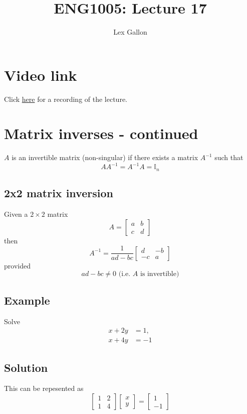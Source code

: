 \documentclass[11pt]{article}
\begin{document}
\title{ENG1005: Lecture 17}
\author{Lex Gallon}
\maketitle

\tableofcontents

\section*{Video link}
Click \href{https://echo360.org.au/lesson/G_32340f5d-ff38-43d2-be9d-d88ddb1b3611_b944cecf-8ba5-40d3-a870-0243a0a9e78c_2020-04-29T14:58:00.000_2020-04-29T15:53:00.000/classroom}{here} for a recording of the lecture.

\section{Matrix inverses - continued}
$A$ is an invertible matrix (non-singular) if there exists a matrix $A^{-1}$ such that
\[ AA^{-1} = A^{-1}A = \mathbb{I}_n \]

\subsection{2x2 matrix inversion}
Given a $2 \times 2$ matrix
\[ A = \begin{bmatrix}
a & b \\
c & d
\end{bmatrix} \]
then
\[ A^{-1} = \frac{1}{ad -bc} \begin{bmatrix}
d & -b\\
-c & a
\end{bmatrix} \]
provided
\[ ad - bc \not = 0 \text{ (i.e. } A \text{ is invertible)} \]

\subsection{Example}
Solve
\begin{align*}
x+ 2y &= 1, \\
x + 4y &= -1
\end{align*}

\subsection{Solution}
This can be repesented as
\[
\begin{bmatrix}
1 & 2 \\
1 & 4
\end{bmatrix}
\begin{bmatrix}
x\\
y
\end{bmatrix}
= \begin{bmatrix}
1\\
-1
\end{bmatrix}
\]
\end{document}
